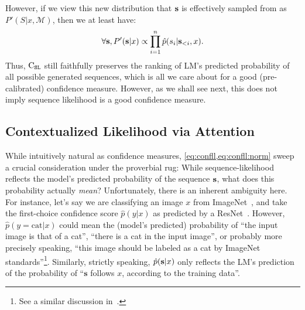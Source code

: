 However, if we view this new distribution that $\mathbf{s}$ is effectively sampled from as $P'(S|x,\mathcal{M})$, then we at least have:
\begin{align}
    \forall \mathbf{s}, {P'}(\mathbf{s}|x) \propto \prod_{i=1}^n \hat{p}(s_i|\mathbf{s}_{<i},x) \label{eq:propto}.
\end{align}
Thus, $\text{C}_{\texttt{SL}}$ still faithfully preserves the ranking of LM's predicted probability of all possible generated sequences, which is all we care about for a good (pre-calibrated) confidence measure.
However, as we shall see next, this does not imply sequence likelihood is a good confidence measure.





\subsection{Contextualized Likelihood via Attention}

While intuitively natural as confidence measures, \cref{eq:confll,eq:confll:norm} sweep a crucial consideration under the proverbial rug: While sequence-likelihood reflects the model's predicted probability of the sequence $\mathbf{s}$, what does this probability actually \textit{mean}?
Unfortunately, there is an inherent ambiguity here.
For instance, let's say we are classifying an image $x$ from ImageNet~\cite{deng2009imagenet}, and take the first-choice confidence score $\hat{p}(y|x)$ as predicted by a ResNet~\cite{he2016deep}.
However, $\hat{p}(y=\text{cat}|x)$ could mean the (model's predicted) probability of ``the input image is that of a cat'', ``there is a cat in the input image'', or probably more precisely speaking, ``this image should be labeled as a cat by ImageNet standards''\footnote{See a similar discussion in~\citet{beyer2020we}.}.
Similarly, strictly speaking, $\hat{p}(\mathbf{s}|x)$ only reflects the LM's prediction of the probability of ``$\mathbf{s}$ follows $x$, according to the training data''.

